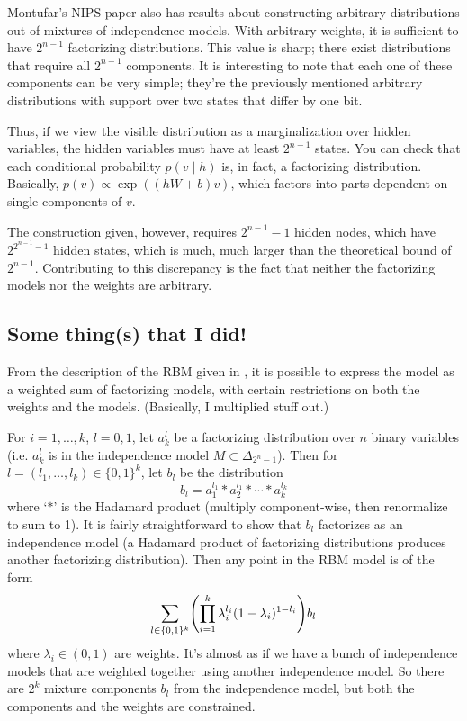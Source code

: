 \documentclass[12pt]{article}
\begin{document}
Montufar's NIPS paper also has results about constructing arbitrary
distributions out of mixtures of independence models.  With arbitrary weights,
it is sufficient to have $2^{n-1}$ factorizing distributions.  This value is
sharp; there exist distributions that require all $2^{n-1}$ components.
It is interesting to note that each one of these components can be very simple;
they're the previously mentioned arbitrary distributions with support over two
states that differ by one bit.

Thus, if we view the visible distribution as a marginalization over hidden
variables, the hidden variables must have at least $2^{n-1}$ states.  You can
check that each conditional probability $p(v \mid h)$ is, in fact, a factorizing
distribution.  Basically, $p(v) \propto \exp((hW + b)v)$, which factors into
parts dependent on single components of $v$.

The construction given, however, requires $2^{n-1} - 1$ hidden nodes, which have
$2^{2^{n-1} - 1}$ hidden states, which is much, much larger than the theoretical
bound of $2^{n-1}$.  Contributing to this discrepancy is the fact that neither
the factorizing models nor the weights are arbitrary.

\subsection{Some thing(s) that I did!}

From the description of the RBM given in \cite{CMS09}, it is possible to express
the model as a weighted sum of factorizing models, with certain restrictions on
both the weights and the models.  (Basically, I multiplied stuff out.)  

For $i = 1, \ldots, k$, $l = 0,1$, let $a_k^l$ be a factorizing distribution
over $n$ binary variables (i.e. $a_k^l$ is in the independence model $M \subset
\Delta_{2^n - 1}$).  Then for $l = (l_1, \ldots, l_k) \in \{0,1\}^k$, let $b_l$
be the distribution
\[
    b_l = a_1^{l_1} * a_2^{l_1} * \cdots * a_k^{l_k}
\]
where `$*$' is the Hadamard product (multiply component-wise, then renormalize
to sum to 1).  It is fairly straightforward to show that $b_l$ factorizes as an
independence model (a Hadamard product of factorizing distributions produces
another factorizing distribution).  Then any point in the RBM model is of the
form
\[
    \sum_{l \in \{0,1\}^k} \pdel*{\prod_{i=1}^k \lambda_i^{l_i} (1 -
    \lambda_i)^{1 - l_i}} b_l
\]
where $\lambda_i \in (0,1)$ are weights.  It's almost as if we have a bunch of
independence models that are weighted together using another independence model.
So there are $2^k$ mixture components $b_l$ from the independence model, but
both the components and the weights are constrained.
\end{document}
